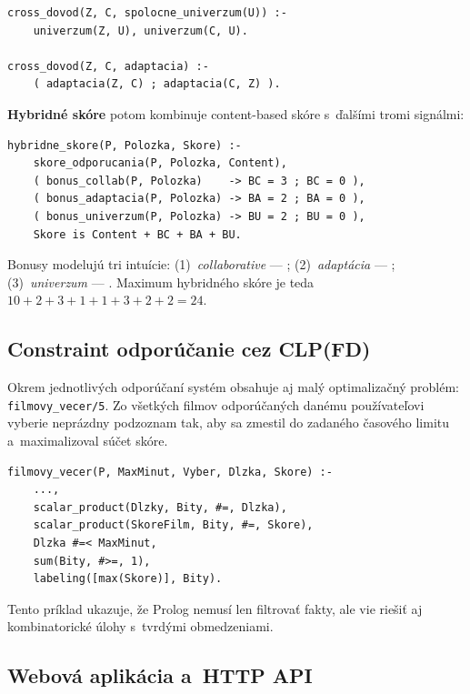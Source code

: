 \documentclass[11pt,a4paper]{article}
\begin{document}
\begin{lstlisting}
cross_dovod(Z, C, spolocne_univerzum(U)) :-
    univerzum(Z, U), univerzum(C, U).

cross_dovod(Z, C, adaptacia) :-
    ( adaptacia(Z, C) ; adaptacia(C, Z) ).
\end{lstlisting}

\noindent
\textbf{Hybridné skóre} potom kombinuje content-based skóre
s~ďalšími tromi signálmi:

\begin{lstlisting}
hybridne_skore(P, Polozka, Skore) :-
    skore_odporucania(P, Polozka, Content),
    ( bonus_collab(P, Polozka)    -> BC = 3 ; BC = 0 ),
    ( bonus_adaptacia(P, Polozka) -> BA = 2 ; BA = 0 ),
    ( bonus_univerzum(P, Polozka) -> BU = 2 ; BU = 0 ),
    Skore is Content + BC + BA + BU.
\end{lstlisting}

\noindent
Bonusy modelujú tri intuície: (1)~\emph{collaborative} ---
; (2)~\emph{adaptácia}
--- ; (3)~\emph{univerzum}
--- . Maximum
hybridného skóre je teda~$10 + 2 + 3 + 1 + 1 + 3 + 2 + 2 = 24$.

\subsection{Constraint odporúčanie cez CLP(FD)}

Okrem jednotlivých odporúčaní systém obsahuje aj malý optimalizačný
problém: \texttt{filmovy\_vecer/5}. Zo všetkých filmov odporúčaných
danému používateľovi vyberie neprázdny podzoznam tak, aby sa zmestil
do zadaného časového limitu a~maximalizoval súčet skóre.

\begin{lstlisting}
filmovy_vecer(P, MaxMinut, Vyber, Dlzka, Skore) :-
    ...,
    scalar_product(Dlzky, Bity, #=, Dlzka),
    scalar_product(SkoreFilm, Bity, #=, Skore),
    Dlzka #=< MaxMinut,
    sum(Bity, #>=, 1),
    labeling([max(Skore)], Bity).
\end{lstlisting}

\noindent
Tento príklad ukazuje, že Prolog nemusí len filtrovať fakty, ale
vie riešiť aj kombinatorické úlohy s~tvrdými obmedzeniami.

\subsection{Webová aplikácia a~HTTP API}
\label{sec:web}
\end{document}
